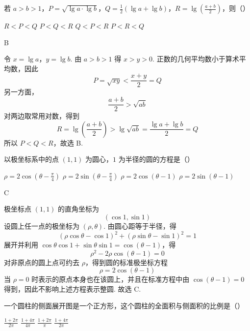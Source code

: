 \begin{problem}
若 \(a > b > 1\)，\(P = \sqrt{\lg a \cdot \lg b}\)，\(Q = \frac{1}{2} (\lg a + \lg b)\)，\(R = \lg \left(\frac{a + b}{2}\right)\)，则（\quad）

\choices
    {\(R < P < Q\)}
    {\(P < Q < R\)}
    {\(Q < P < R\)}
    {\(P < R < Q\)}
\end{problem}

\begin{answer}
B
\end{answer}

\begin{solution}
令 \(x=\lg a\)，\(y=\lg b\).
由 \(a>b>1\) 得 \(x>y>0\). 正数的几何平均数小于算术平均数，因此
\[
P=\sqrt{xy}<\frac{x+y}{2}=Q
\]
另一方面，
\[
\frac{a+b}{2}>\sqrt{ab}
\]
对两边取常用对数，得到
\[
R=\lg\left(\frac{a+b}{2}\right)>\lg\sqrt{ab}
=\frac{\lg a+\lg b}{2}=Q
\]
所以 \(P<Q<R\)，故选 B.
\end{solution}

\begin{problem}
以极坐标系中的点 \((1,1)\) 为圆心，\(1\) 为半径的圆的方程是（\quad）

\choices
    {\(\rho = 2\cos \left(\theta -\frac{\pi}{4}\right)\)}
    {\(\rho = 2\sin \left(\theta -\frac{\pi}{4}\right)\)}
    {\(\rho = 2\cos (\theta -1)\)}
    {\(\rho = 2\sin (\theta -1)\)}
\end{problem}

\begin{answer}
C
\end{answer}

\begin{solution}
极坐标点 \((1,1)\) 的直角坐标为
\[
(\cos 1,\sin 1)
\]
设圆上任一点的极坐标为 \((\rho,\theta)\). 由圆心距等于半径，得
\[
(\rho\cos\theta-\cos1)^2+(\rho\sin\theta-\sin1)^2=1
\]
展开并利用 \(\cos\theta\cos1+\sin\theta\sin1=\cos(\theta-1)\)，得
\[
\rho^2-2\rho\cos(\theta-1)=0
\]
对非原点的圆上点可约去 \(\rho\)，得到圆的标准极坐标方程
\[
\rho=2\cos(\theta-1)
\]
当 \(\rho=0\) 时表示的原点本身也在该圆上，并且在标准方程中由 \(\cos(\theta-1)=0\) 得到，因此不影响上述方程表示整圆. 故选 C.
\end{solution}

\begin{problem}
一个圆柱的侧面展开图是一个正方形，这个圆柱的全面积与侧面积的比例是（\quad）

\choices
    {\(\frac{1 + 2\pi}{2\pi}\)}
    {\(\frac{1 + 4\pi}{4\pi}\)}
    {\(\frac{1 + 2\pi}{\pi}\)}
    {\(\frac{1 + 4\pi}{2\pi}\)}
\end{problem}

